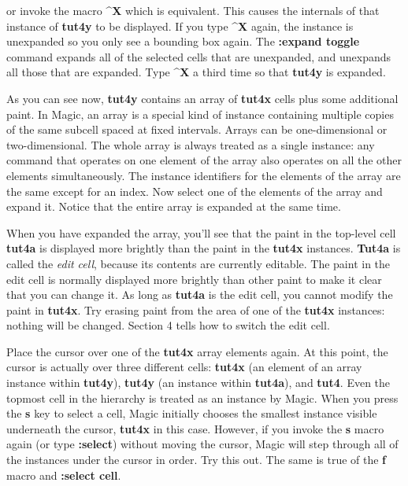 \documentclass[letterpaper,twoside,12pt]{article}
\begin{document}
or invoke the macro {\bfseries \^{}X}
which is equivalent.  This causes the internals of that instance
of {\bfseries tut4y} to be displayed.  If you type {\bfseries \^{}X} again, the
instance is unexpanded so you only see a bounding box again.
The {\bfseries :expand toggle} command expands all of the selected cells
that are unexpanded, and unexpands all those that are expanded.
Type {\bfseries \^{}X} a third time so that {\bfseries tut4y} is expanded.

As you can see now, {\bfseries tut4y}
contains an array of {\bfseries tut4x} cells plus some additional
paint.  In Magic, an array is a special
kind of instance containing multiple copies of the same subcell spaced
at fixed intervals.  Arrays can be one-dimensional or two-dimensional.
The whole array is always treated
as a single instance:  any command that operates on one element of
the array also operates on all the other elements simultaneously.
The instance identifiers for the elements of the array
are the same except for an index.  Now select one of the elements
of the array and expand it.  Notice that the entire array is
expanded at the same time.

When you have expanded the array, you'll see that the paint
in the top-level cell {\bfseries tut4a} is displayed more brightly than the paint
in the {\bfseries tut4x} instances.  {\bfseries Tut4a} is called
the {\itshape edit cell}, because its contents are currently editable.
The paint in the edit cell is normally displayed more brightly than other
paint to make it clear that you can change it.  As long as {\bfseries tut4a}
is the edit cell, you cannot modify the paint in {\bfseries tut4x}.  Try
erasing paint from the area of one of the {\bfseries tut4x} instances:
nothing will be changed.  Section 4 tells how to switch the
edit cell.

Place the cursor over one of the {\bfseries tut4x} array elements again.
At this point, the cursor is actually over three different
cells: {\bfseries tut4x} (an element of an array
instance within {\bfseries tut4y}), {\bfseries tut4y} (an
instance within {\bfseries tut4a}), and {\bfseries tut4}.
Even the topmost cell in the hierarchy is treated as an instance
by Magic.  When you press
the {\bfseries s} key to select a cell, Magic initially chooses
the smallest instance visible underneath the cursor, {\bfseries tut4x}
in this case.  However, if you invoke the {\bfseries s} macro
again (or type {\bfseries :select}) without moving the cursor, Magic
will step through all of the instances under the cursor in order.
Try this out.
The same is true of the {\bfseries f} macro and {\bfseries :select cell}.
\end{document}
